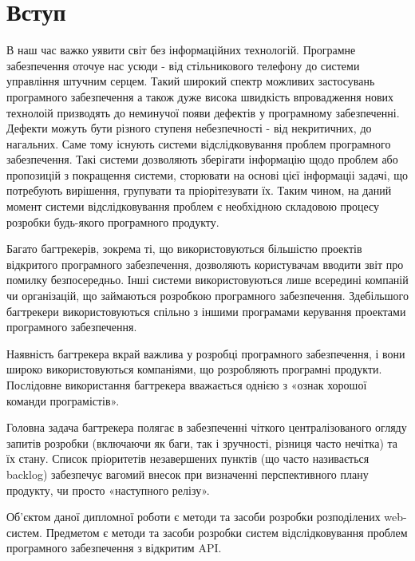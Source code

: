\documentclass[../main.tex]{subfiles}
\begin{document}
\chapter{Вступ}

В наш час важко уявити світ без інформаційних технологій. Програмне забезпечення оточуе нас усюди - від стільникового телефону до системи управління штучним серцем. Такий широкий спектр можливих застосувань програмного забезпечення а також дуже висока швидкість впровадження нових технолоій призводять до неминучої появи дефектів у програмному забезпеченні. Дефекти можуть бути різного ступеня небезпечності - від некритичних, до нагальних. Саме тому існують системи відслідковування проблем програмного забезпечення. Такі системи дозволяють зберігати інформацію щодо проблем або пропозицій з покращення системи, сторювати на основі цієї інформаціі задачі, що потребують вирішення, групувати та пріорітезувати їх. Таким чином, на даний момент системи відслідковування проблем є необхідною складовою процесу розробки будь-якого програмного продукту.

Багато багтрекерів, зокрема ті, що використовуються більшістю проектів відкритого програмного забезпечення, дозволяють користувачам вводити звіт про помилку безпосередньо. Інші системи використовуються лише всередині компаній чи організацій, що займаються розробкою програмного забезпечення. Здебільшого багтрекери використовуються спільно з іншими програмами керування проектами програмного забезпечення.

Наявність багтрекера вкрай важлива у розробці програмного забезпечення, і вони широко використовуються компаніями, що розробляють програмні продукти. Послідовне використання багтрекера вважається однією з «ознак хорошої команди програмістів»\cite{painless_bug_tracking}.

Головна задача багтрекера полягає в забезпеченні чіткого централізованого огляду запитів розробки (включаючи як баги, так і зручності, різниця часто нечітка) та їх стану. Список пріоритетів незавершених пунктів (що часто називається backlog) забезпечує вагомий внесок при визначенні перспективного плану продукту, чи просто «наступного релізу».

Об'єктом даної дипломної роботи є методи та засоби розробки розподілених web-систем. Предметом є методи та засоби розробки систем відслідковування проблем програмного забезпечення з відкритим API.
\end{document}
